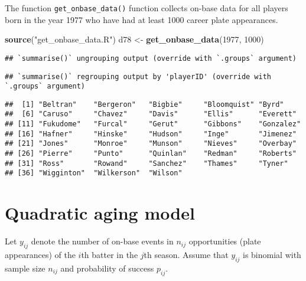 \documentclass[
]{book}
\newenvironment{Shaded}{\begin{snugshade}}{\end{snugshade}}
\newcommand{\DecValTok}[1]{\textcolor[rgb]{0.00,0.00,0.81}{#1}}
\newcommand{\KeywordTok}[1]{\textcolor[rgb]{0.13,0.29,0.53}{\textbf{#1}}}
\newcommand{\NormalTok}[1]{#1}
\newcommand{\OperatorTok}[1]{\textcolor[rgb]{0.81,0.36,0.00}{\textbf{#1}}}
\newcommand{\StringTok}[1]{\textcolor[rgb]{0.31,0.60,0.02}{#1}}
\begin{document}
The function \texttt{get\_onbase\_data()} function collects on-base data for all players born in the year 1977 who have had at least 1000 career plate appearances.

\begin{Shaded}
\begin{Highlighting}[]
\KeywordTok{source}\NormalTok{(}\StringTok{"get_onbase_data.R"}\NormalTok{)}
\NormalTok{d78 <-}\StringTok{ }\KeywordTok{get_onbase_data}\NormalTok{(}\DecValTok{1977}\NormalTok{, }\DecValTok{1000}\NormalTok{)}
\end{Highlighting}
\end{Shaded}

\begin{verbatim}
## `summarise()` ungrouping output (override with `.groups` argument)
\end{verbatim}

\begin{verbatim}
## `summarise()` regrouping output by 'playerID' (override with `.groups` argument)
\end{verbatim}

\begin{Shaded}
\end{Shaded}

\begin{verbatim}
##  [1] "Beltran"    "Bergeron"   "Bigbie"     "Bloomquist" "Byrd"      
##  [6] "Caruso"     "Chavez"     "Davis"      "Ellis"      "Everett"   
## [11] "Fukudome"   "Furcal"     "Gerut"      "Gibbons"    "Gonzalez"  
## [16] "Hafner"     "Hinske"     "Hudson"     "Inge"       "Jimenez"   
## [21] "Jones"      "Monroe"     "Munson"     "Nieves"     "Overbay"   
## [26] "Pierre"     "Punto"      "Quinlan"    "Redman"     "Roberts"   
## [31] "Ross"       "Rowand"     "Sanchez"    "Thames"     "Tyner"     
## [36] "Wigginton"  "Wilkerson"  "Wilson"
\end{verbatim}

\hypertarget{quadratic-aging-model}{%
\section{Quadratic aging model}\label{quadratic-aging-model}}

Let \(y_{ij}\) denote the number of on-base events in \(n_{ij}\) opportunities (plate appearances) of the \(i\)th batter in the \(j\)th season. Assume that \(y_{ij}\) is binomial with sample size \(n_{ij}\) and probability of success \(p_{ij}\).
\end{document}

